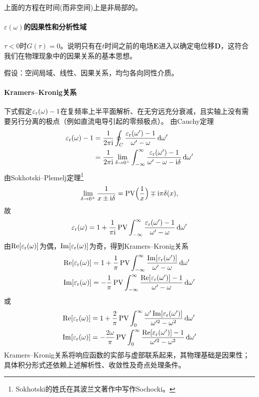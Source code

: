 上面的方程在时间(而非空间)上是非局部的。

\paragraph{$\varepsilon(\omega)$的因果性和分析性域}

$\tau < 0$时$G(\tau) = 0$。说明只有在$t$时间之前的电场$\bm E$进入以确定电位移$\bm D$，这符合我们在物理现象中的因果关系的基本思想。

假设：空间局域、线性、因果关系，均匀各向同性介质。


\paragraph{Kramers--Kronig关系}
下式假定$\varepsilon_\mathrm r(\omega) - 1$在复频率上半平面解析、在无穷远充分衰减，且实轴上没有需要另行分离的极点（例如直流电导引起的零频极点）。
由Cauchy定理
\begin{align*}
    \varepsilon_\mathrm r(\omega) - 1 &= \frac1{2\pi\mathrm{i}}\oint_C\frac{\varepsilon_\mathrm r(\omega') - 1}{\omega' - \omega}\mathop{}\!\mathrm{d}\omega'\\
    &= \frac1{2\pi\mathrm{i}}\lim_{\delta\to0^+}\int_{-\infty}^\infty\frac{\varepsilon_\mathrm r(\omega') - 1}{\omega' - \omega - \mathrm{i}\delta}\mathop{}\!\mathrm{d}\omega'
\end{align*}
由Sokhotski--Plemelj定理\footnote{Sokhotski的姓氏在其波兰文著作中写作Sochocki。}
\begin{equation}
    \label{eq:ed-sokhotski-plemelj}
    \lim_{\delta\to0^+}\frac1{x \pm \mathrm{i}\delta} = \operatorname{PV}\Bigl(\frac1x\Bigr) \mp \mathrm{i}\pi\delta(x),
\end{equation}
故
\[
    \varepsilon_\mathrm r(\omega) = 1 + \frac1{\pi\mathrm{i}}\operatorname{PV}\int_{-\infty}^\infty\frac{\varepsilon_\mathrm r(\omega') - 1}{\omega' - \omega}\mathop{}\!\mathrm{d}\omega'
\]
由$\operatorname{Re}[\varepsilon_\mathrm r(\omega)]$为偶，$\operatorname{Im}[\varepsilon_\mathrm r(\omega)]$为奇，得到Kramers--Kronig关系
\begin{equation}
    \begin{aligned}
        \operatorname{Re}[\varepsilon_\mathrm r(\omega)] &= 1 + \frac1\pi\operatorname{PV}\int_{-\infty}^\infty\frac{\operatorname{Im}[\varepsilon_\mathrm r(\omega')]}{\omega' - \omega}\mathop{}\!\mathrm{d}\omega'\\
        \operatorname{Im}[\varepsilon_\mathrm r(\omega)] &= -\frac1\pi\operatorname{PV}\int_{-\infty}^\infty\frac{\operatorname{Re}[\varepsilon_\mathrm r(\omega')] - 1}{\omega' - \omega}\mathop{}\!\mathrm{d}\omega'\\
    \end{aligned}
\end{equation}
或
\begin{equation}
    \begin{aligned}
        \operatorname{Re}[\varepsilon_\mathrm r(\omega)] &= 1 + \frac2\pi\operatorname{PV}\int_0^\infty\frac{\omega'\operatorname{Im}[\varepsilon_\mathrm r(\omega')]}{\omega'^2 - \omega^2}\mathop{}\!\mathrm{d}\omega'\\
        \operatorname{Im}[\varepsilon_\mathrm r(\omega)] &= -\frac{2\omega}\pi\operatorname{PV}\int_0^\infty\frac{\operatorname{Re}[\varepsilon_\mathrm r(\omega')] - 1}{\omega'^2 - \omega^2}\mathop{}\!\mathrm{d}\omega'\\
    \end{aligned}
\end{equation}
Kramers--Kronig关系将响应函数的实部与虚部联系起来，其物理基础是因果性；具体积分形式还依赖上述解析性、收敛性及奇点处理条件。

